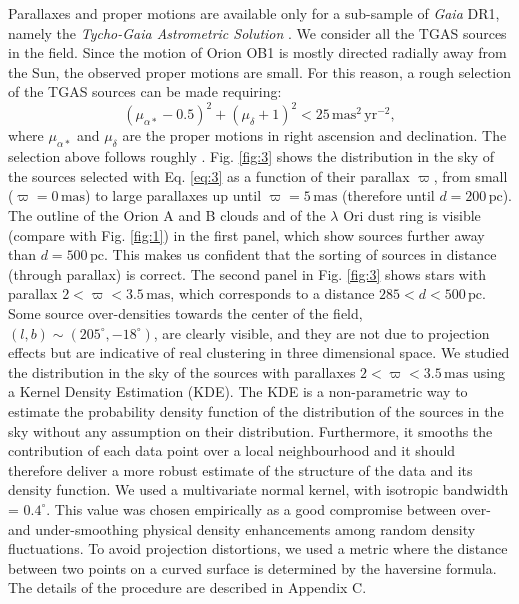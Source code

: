 \documentclass[onecolumn]{aa} %
\begin{document}
Parallaxes and proper motions are available only for a sub-sample of \textit{Gaia} DR1, namely the \textit{Tycho-Gaia Astrometric Solution} \citep[TGAS][]{Michalik2015, Lindegren2016}. We consider all the TGAS sources in the field. 
Since the  motion of Orion OB1 is mostly directed radially away from the Sun, the observed proper motions are small. For this reason, a rough selection of the TGAS sources can be made requiring:
\begin{equation}\label{eq:3}
(\mu_{\alpha*} - 0.5)^2 + (\mu_{\delta}+1)^2 < 25  \,\mathrm{mas^2 \, yr^{-2}},
\end{equation}
where $\mu_{\alpha*}$ and $\mu_{\delta}$ are the proper motions in right ascension and declination. The selection above follows roughly \cite{deZeeuw1999}.
Fig. \ref{fig:3} shows the distribution  in the sky of the sources selected with Eq. \eqref{eq:3} as a function of their parallax $\varpi$, from small ($\varpi = 0 \, \mathrm{mas}$) to large parallaxes up until $\varpi = 5 \, \mathrm{mas}$ (therefore until $d = 200 \, \mathrm{pc}$).   
The outline of the Orion A and B clouds and of the $\lambda$ Ori dust ring is visible (compare with Fig. \ref{fig:1}) in the first panel, which show sources further away than $d = 500 \, \mathrm{pc}$.  This makes us confident that the sorting of sources in distance (through parallax) is correct.
The second panel in Fig. \ref{fig:3} shows stars with parallax $2 < \varpi < 3.5 \, \mathrm{mas}$, which corresponds to a distance $285 < d < 500 \, \mathrm{pc}$. 
Some source over-densities towards the center of the field, $(l, b) \sim (205^{\circ}, -18^{\circ})$, are clearly visible, and they are not due to projection effects but are indicative of real clustering in three dimensional space. 
We studied the  distribution in the sky of the sources with parallaxes $2 < \varpi < 3.5 \, \mathrm{mas}$ using a Kernel Density Estimation (KDE). The KDE is a non-parametric way to estimate the probability density function of the distribution of the sources in the sky without any assumption on their distribution. Furthermore, it smooths the contribution of each data point over a local neighbourhood and it should therefore deliver a more robust estimate of the structure of the data and its density function. We used a 
multivariate normal kernel, with isotropic  bandwidth =  $0.4^{\circ}$.  This value was chosen empirically as a good compromise between over- and under-smoothing physical density enhancements among random density fluctuations.
To avoid projection distortions, we used a metric where the distance between two points on a curved surface is determined by the haversine formula. The details of the procedure are described in Appendix C. 
\end{document}

